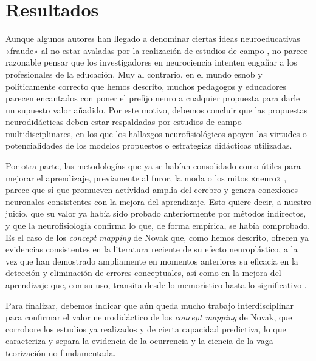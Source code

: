 \documentclass[spanish]{textolivre}
\begin{document}
\section{Resultados}\label{sec-resultados}

Aunque algunos autores han llegado a denominar ciertas ideas neuroeducativas «fraude» al no estar avaladas por la realización de estudios de campo \cite{jorgenson2003brain}, %
no parece razonable pensar que los investigadores en neurociencia intenten engañar a los profesionales de la educación. Muy al contrario, en el mundo esnob y políticamente correcto que hemos descrito, muchos pedagogos y educadores parecen encantados con poner el prefijo neuro a cualquier propuesta para darle un supuesto valor añadido. Por este motivo, debemos concluir que las propuestas neurodidácticas deben estar respaldadas por estudios de campo multidisciplinares, en los que los hallazgos neurofisiológicos apoyen las virtudes o potencialidades de los modelos propuestos o estrategias didácticas utilizadas.

Por otra parte, las metodologías que ya se habían consolidado como útiles para mejorar el aprendizaje, previamente al furor, la moda o los mitos «neuro» \cite{howard2014neuroscience}, %
parece que sí que promueven actividad amplia del cerebro y genera conexiones neuronales consistentes con la mejora del aprendizaje. Esto quiere decir, a nuestro juicio, que su valor ya había sido probado anteriormente por métodos indirectos, y que la neurofisiología confirma lo que, de forma empírica, se había comprobado. Es el caso de los \textit{concept mapping} de Novak que, como hemos descrito, ofrecen ya evidencias consistentes en la literatura reciente de su efecto neuroplástico, a la vez que han demostrado ampliamente en momentos anteriores su eficacia en la detección y eliminación de errores conceptuales, así como en la mejora del aprendizaje que, con su uso, transita desde lo memorístico hasta lo significativo \cite{garcia2008mapa,gonzalez2013modelos}. %

Para finalizar, debemos indicar que aún queda mucho trabajo interdisciplinar para confirmar el valor neurodidáctico de los \textit{concept mapping} de Novak, que corrobore los estudios ya realizados y de cierta capacidad predictiva, lo que caracteriza y separa la evidencia de la ocurrencia y la ciencia de la vaga teorización no fundamentada.
\end{document}
